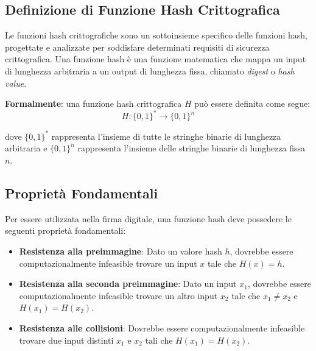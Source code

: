 \documentclass[a4paper,12pt]{report}
\begin{document}
\subsection*{Definizione di Funzione Hash Crittografica}
Le funzioni hash crittografiche sono un sottoinsieme specifico delle funzioni hash, progettate e analizzate per soddisfare determinati requisiti di sicurezza crittografica. 
Una funzione hash è una funzione matematica che mappa un input di lunghezza arbitraria a un output di lunghezza fissa, chiamato \textit{digest} o \textit{hash value}.

\textbf{Formalmente}: una funzione hash crittografica $H$ può essere definita come segue:
\[H: \{0,1\}^* \rightarrow \{0,1\}^n\]

dove $\{0,1\}^*$ rappresenta l'insieme di tutte le stringhe binarie di lunghezza arbitraria e $\{0,1\}^n$ rappresenta l'insieme delle stringhe binarie di lunghezza fissa $n$.

\subsection*{Proprietà Fondamentali}

Per essere utilizzata nella firma digitale, una funzione hash deve possedere le seguenti proprietà fondamentali:

\begin{itemize}
    \item \textbf{Resistenza alla preimmagine}: Dato un valore hash $h$, dovrebbe essere computazionalmente infeasible trovare un input $x$ tale che $H(x) = h$.
    \item \textbf{Resistenza alla seconda preimmagine}: Dato un input $x_1$, dovrebbe essere computazionalmente infeasible trovare un altro input $x_2$ tale che $x_1 \neq x_2$ e $H(x_1) = H(x_2)$.
    \item \textbf{Resistenza alle collisioni}: Dovrebbe essere computazionalmente infeasible trovare due input distinti $x_1$ e $x_2$ tali che $H(x_1) = H(x_2)$.
\end{itemize}
\end{document}
